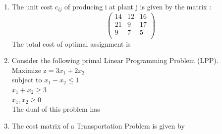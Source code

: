 \documentclass[journal,12pt,twocolumn]{IEEEtran}
\begin{document}
\begin{enumerate}
\item The unit cost $\text{c}_{ij}$ of producing i at plant j is given by the matrix : \\
\medskip
\[\begin{pmatrix}
14&12&16 \\
21&9&17 \\
9&7&5 \\
\end{pmatrix}\]
\medskip
The total cost of optimal assignment is \\

\begin{enumerate}[(A)]
\end{enumerate}

\item Consider the following primal Linear Programming Problem (LPP).\\
Maximize $\text{z} \! = \! 3x_1 \! + \! 2x_2$ \\ \medskip
subject to $x_1 \! - \! x_2 \! \leqslant \! 1$ \\ \medskip
$x_1 \! + \! x_2 \! \geqslant \! 3$ \\ \medskip
$x_1, \! x_2 \! \geqslant \! 0$\\ \medskip
The dual of this problem has 

\begin{enumerate}[(A)]
\end{enumerate}

\item The cost matrix of a Transportation Problem is given by \\ \medskip


\end{enumerate}
\end{document}
